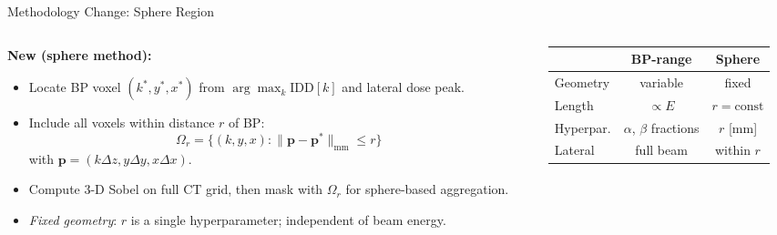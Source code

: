 \documentclass[aspectratio=169, 10pt]{beamer}
\begin{document}
\begin{frame}{Methodology Change: Sphere Region}
\begin{columns}[T]
\begin{column}{0.50\textwidth}
{      \textbf{New (sphere method):}
      \begin{itemize}\setlength{\itemsep}{0pt}\setlength{\parskip}{0pt}
        \item Locate BP voxel $(k^*, y^*, x^*)$ from
              $\arg\max_k \text{IDD}[k]$ and lateral dose peak.
        \item Include all voxels within distance $r$ of BP:
              \begin{equation*}
                \Omega_r = \bigl\{(k,y,x) : \|\mathbf{p} - \mathbf{p}^*\|_{\mathrm{mm}} \leq r\bigr\}
              \end{equation*}
              with $\mathbf{p} = (k\Delta z, y\Delta y, x\Delta x)$.
        \item Compute 3-D Sobel on full CT grid, then mask
              with $\Omega_r$ for sphere-based aggregation.
        \item \textit{Fixed geometry}: $r$ is a single
              hyperparameter; independent of beam energy.
      \end{itemize}
      }
    \end{column}
    \begin{column}{0.46\textwidth}
      \begin{center}
      \end{center}

      \vspace{4pt}
      \begin{center}
      {\small
      \begin{tabular}{lcc}
        \toprule
        & \textbf{BP-range} & \textbf{Sphere} \\
        \midrule
        Geometry   & variable & fixed \\
        Length     & $\propto E$ & $r = \text{const}$ \\
        Hyperpar.  & $\alpha$, $\beta$ fractions & $r$ [mm] \\
        Lateral    & full beam & within $r$ \\
        \bottomrule
      \end{tabular}
      }
      \end{center}
    \end{column}
  \end{columns}
\end{frame}
\end{document}
